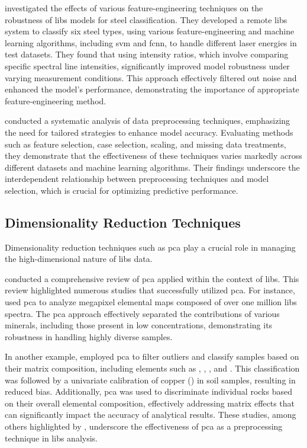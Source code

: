 \citet{jeonEffectsFeatureEngineering2024} investigated the effects of various feature-engineering techniques on the robustness of \gls{libs} models for steel classification.
They developed a remote \gls{libs} system to classify six steel types, using various feature-engineering and machine learning algorithms, including \gls{svm} and \gls{fcnn}, to handle different laser energies in test datasets.
They found that using intensity ratios, which involve comparing specific spectral line intensities, significantly improved model robustness under varying measurement conditions.
This approach effectively filtered out noise and enhanced the model's performance, demonstrating the importance of appropriate feature-engineering method.

\citet{Huang2015AnEA} conducted a systematic analysis of data preprocessing techniques, emphasizing the need for tailored strategies to enhance model accuracy.
Evaluating methods such as feature selection, case selection, scaling, and missing data treatments, they demonstrate that the effectiveness of these techniques varies markedly across different datasets and machine learning algorithms.
Their findings underscore the interdependent relationship between preprocessing techniques and model selection, which is crucial for optimizing predictive performance.

\subsection{Dimensionality Reduction Techniques}
Dimensionality reduction techniques such as \gls{pca} play a crucial role in managing the high-dimensional nature of \gls{libs} data.

\citet{pca_review_paper} conducted a comprehensive review of \gls{pca} applied within the context of \gls{libs}.
This review highlighted numerous studies that successfully utilized \gls{pca}.
For instance, \citet{moncayo_pca} used \gls{pca} to analyze megapixel elemental maps composed of over one million \gls{libs} spectra.
The \gls{pca} approach effectively separated the contributions of various minerals, including those present in low concentrations, demonstrating its robustness in handling highly diverse samples.

In another example, \citet{porizka_pca} employed \gls{pca} to filter outliers and classify samples based on their matrix composition, including elements such as , , , and .
This classification was followed by a univariate calibration of copper () in soil samples, resulting in reduced bias.
Additionally, \gls{pca} was used to discriminate individual rocks based on their overall elemental composition, effectively addressing matrix effects that can significantly impact the accuracy of analytical results.
These studies, among others highlighted by \cite{pca_review_paper}, underscore the effectiveness of \gls{pca} as a preprocessing technique in \gls{libs} analysis.

